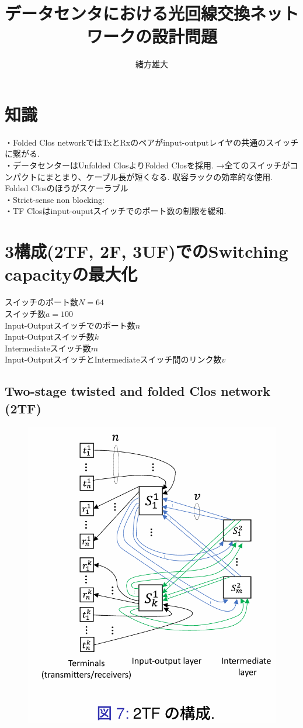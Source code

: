 \documentclass[11pt, a4paper]{jarticle}
\title{データセンタにおける光回線交換ネットワークの設計問題}
\author{緒方雄大}
\begin{document}
\maketitle

\section{知識}
\noindent ・Folded Clos networkではTxとRxのペアがinput-outputレイヤの共通のスイッチに繋がる.\\
・データセンターはUnfolded ClosよりFolded Closを採用.
→全てのスイッチがコンパクトにまとまり、ケーブル長が短くなる. 収容ラックの効率的な使用. Folded Closのほうがスケーラブル\\
・Strict-sense non blocking: \\
・TF Closはinput-ouputスイッチでのポート数の制限を緩和. \\ 

\section{3構成(2TF, 2F, 3UF)でのSwitching capacityの最大化}
\noindent スイッチのポート数$N=64$\\
スイッチ数$a=100$\\
Input-Outputスイッチでのポート数$n$\\
Input-Outputスイッチ数$k$\\
Intermediateスイッチ数$m$\\
Input-OutputスイッチとIntermediateスイッチ間のリンク数$v$

\subsection{Two-stage twisted and folded Clos network (2TF)}

\begin{figure}[H]
    \centering
    \includegraphics[width=0.5\linewidth]{2tf.png}
  \end{figure}
\end{document}
